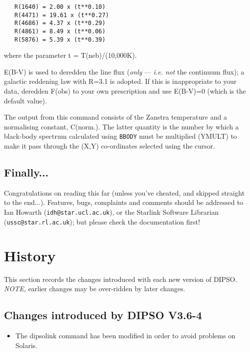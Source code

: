 \documentclass[twoside,11pt]{article}
\newcommand{\htmlref}[2]{#1}
\renewcommand{\_}{\texttt{\symbol{95}}}
\begin{document}
\begin {description}
\begin{verbatim}
   R(1640) = 2.00 x (t**0.10)
   R(4471) = 19.61 x (t**0.27)
   R(4686) = 4.37 x (t**0.29)
   R(4861) = 8.49 x (t**0.06)
   R(5876) = 5.39 x (t**0.39)
\end{verbatim}

where the parameter t = T(neb)/(10,000K).

E(B-V) is used to deredden the line flux ({\em only} --- {\em i.e.}
{\em not} the continuum flux); a galactic reddening law with R=3.1 is
adopted. If this is inappropriate to your data, deredden F(obs) to
your own prescription and use E(B-V)=0 (which is the default value).

The output from this command consists of the Zanstra temperature and a
normalising constant, C(norm.). The latter quantity is the number by
which a black-body spectrum calculated using \htmlref{{\tt{BBODY}}}{COM:BBODY}  must be multiplied
(YMULT) to make it pass through the (X,Y) co-ordinates selected using
the cursor.

\end{description}

\subsection{Finally...}
Congratulations on reading this far (unless you've cheated, and skipped
straight to the end...). Features, bugs, complaints and comments should
be addressed to Ian Howarth ({\tt{idh@star.ucl.ac.uk}}),  or the Starlink
Software Librarian ({\tt{ussc@star.rl.ac.uk}});  but please check the
documentation first!

\newpage

\section{\label{APP:HISTORY}History}


This section records the changes introduced with each new version of DIPSO.
{\em NOTE,} earlier changes may be over-ridden by later changes.

\subsection{Changes introduced by DIPSO V3.6-4}
\begin{itemize}
\item The dipso\_link command has been modified in order to avoid
problems on Solaris.
\end{itemize}
\end{document}
